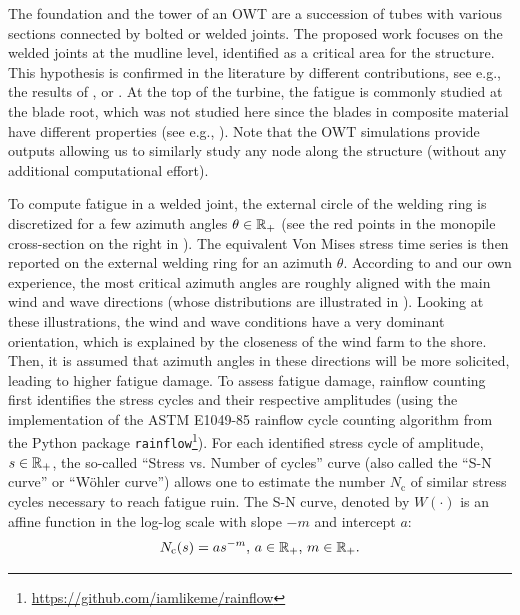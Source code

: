The foundation and the tower of an OWT are a succession of tubes with various sections connected by bolted or welded joints. 
The proposed work focuses on the welded joints at the mudline level, identified as a critical area for the structure. 
This hypothesis is confirmed in the literature by different contributions, see e.g., the results of \citet[Fig. 12]{muller_cheng_2018}, or \citet{katsikogiannis_2021_owt_fatigue}. 
At the top of the turbine, the fatigue is commonly studied at the blade root, which was not studied here since the blades in composite material have different properties (see e.g., \citealp{dimitrov_2013}). 
Note that the OWT simulations provide outputs allowing us to similarly study any node along the structure (without any additional computational effort).

To compute fatigue in a welded joint, the external circle of the welding ring is discretized for a few azimuth angles $\theta \in \mathbb{R}_+$ (see the red points in the monopile cross-section on the right in ). 
The equivalent Von Mises stress time series is then reported on the external welding ring for an azimuth $\theta$. 
According to \cite{li_zhan_2020} and our own experience, the most critical azimuth angles are roughly aligned with the main wind and wave directions (whose distributions are illustrated in ). 
Looking at these illustrations, the wind and wave conditions have a very dominant orientation, which is explained by the closeness of the wind farm to the shore. 
Then, it is assumed that azimuth angles in these directions will be more solicited, leading to higher fatigue damage. 
To assess fatigue damage, rainflow counting \citep{dowling_1972} first identifies the stress cycles and their respective amplitudes (using the implementation of the ASTM E1049-85 rainflow cycle counting algorithm from the Python package \texttt{rainflow}\footnote{\href{https://github.com/iamlikeme/rainflow}{https://github.com/iamlikeme/rainflow}}). 
For each identified stress cycle of amplitude, $s \in \mathbb{R}_+$, the so-called ``Stress vs. Number of cycles'' curve (also called the ``S-N curve'' or ``W\"ohler curve'') allows one to estimate the number $N_{\mathrm{c}}$ of similar stress cycles necessary to reach fatigue ruin. 
The S-N curve, denoted by $W(\cdot)$ is an affine function in the log-log scale with slope $-m$ and intercept $a$:
\begin{equation}
    N_{\mathrm{c}}(s) = a s^{-m}, \, a\in\mathbb{R}_+, \, m\in\mathbb{R}_+.
    \label{eq:wohler}
\end{equation}

